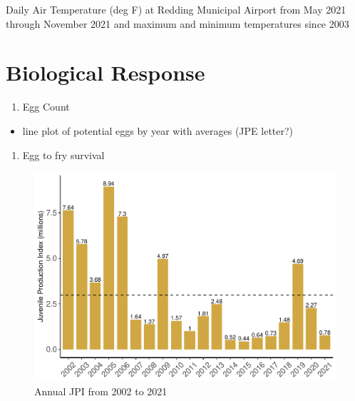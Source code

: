 \documentclass[
]{book}
\providecommand{\tightlist}{%
  \setlength{\itemsep}{0pt}\setlength{\parskip}{0pt}}
\theoremstyle{definition}
\theoremstyle{definition}
\theoremstyle{definition}
\theoremstyle{definition}
\theoremstyle{remark}
\begin{document}
\label{fig:KRDDatemp-fig}Daily Air Temperature (deg F) at Redding Municipal Airport from May 2021 through November 2021 and maximum and minimum temperatures since 2003

\hypertarget{biological-response-1}{%
\section{Biological Response}\label{biological-response-1}}

\begin{enumerate}
\def\labelenumi{\arabic{enumi}.}
\tightlist
\item
  Egg Count
\end{enumerate}

\begin{itemize}
\tightlist
\item
  line plot of potential eggs by year with averages (JPE letter?)
\end{itemize}

\begin{enumerate}
\def\labelenumi{\arabic{enumi}.}
\setcounter{enumi}{1}
\tightlist
\item
  Egg to fry survival
\end{enumerate}

\begin{figure}
\centering
\includegraphics{_main_files/figure-latex/JPI-fig-1.pdf}
\caption{\label{fig:JPI-fig}Annual JPI from 2002 to 2021}
\end{figure}
\end{document}
